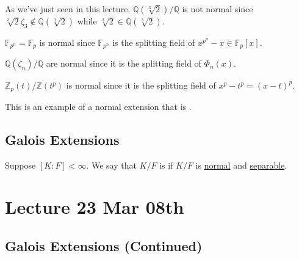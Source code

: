 \documentclass[notoc,notitlepage]{tufte-book}
\begin{document}
\begin{eg}
  As we've just seen in this lecture, $\mathbb{Q}(\sqrt[3]{2}) / \mathbb{Q}$ is
  not normal since $\sqrt[3]{2} \zeta_3 \notin \mathbb{Q}(\sqrt[3]{2})$ while
  $\sqrt[3]{2} \in \mathbb{Q}(\sqrt[3]{2})$.
\end{eg}

\begin{eg}
  $\mathbb{F}_{p^n} = \mathbb{F}_p$ is normal since $\mathbb{F}_{p^n}$ is the
  splitting field of $x^{p^n} - x \in \mathbb{F}_p[x]$.
\end{eg}

\begin{eg}
   $\mathbb{Q}(\zeta_n) / \mathbb{Q}$ are normal
  since it is the splitting field of $\Phi_n(x)$.
\end{eg}

\begin{eg}[\imponote]
  $\mathbb{Z}_p(t) / \mathbb{Z}(t^p)$ is normal since it is the splitting field
  of $x^p - t^p = (x - t)^p$.

  This is an example of a normal extension that is .
\end{eg}


\section{Galois Extensions}%
\label{sec:galois_extensions}

\begin{defn}\label{defn:galois_extension}
  Suppose $[ K : F ] < \infty$. We say that $K / F$ is  if $K /
  F$ is \hyperref[defn:normal_extension]{normal} and
  \hyperref[defn:separable_elements_and_separable_extensions]{separable}.
\end{defn}



\chapter{Lecture 23 Mar 08th}%
\label{chp:lecture_23_mar_08th}

\section{Galois Extensions (Continued)}%
\label{sec:galois_extensions_continued}
\end{document}
